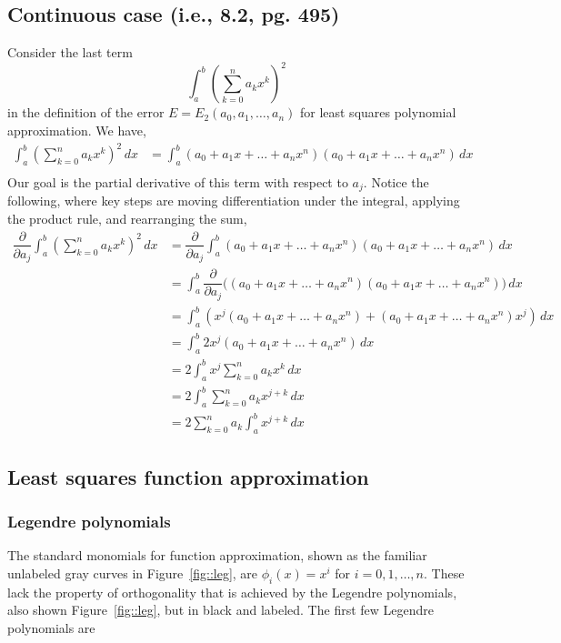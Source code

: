 \documentclass[11pt]{article}
\begin{document}
\subsection*{Continuous case (i.e., 8.2, pg. 495)}
Consider the last term \[\int_a^b \left(\sum_{k=0}^n a_k x^k\right)^2\] in the definition of the error \(E = E_2(a_0, a_1, \dots, a_n)\) for least squares polynomial approximation. We have,
\begin{align*}
\int_a^b \left(\sum_{k=0}^n a_k x^k\right)^2\,dx %
& = \int_a^b (a_0 + a_1x + \dots + a_n x^n)(a_0 + a_1x + \dots + a_n x^n)\,dx\\
\end{align*}
Our goal is the partial derivative of this term with respect to \(a_j\). Notice the following, where key steps are moving differentiation under the integral, applying the product rule, and rearranging the sum,
\begin{align*}
\dfrac{\partial}{\partial a_j}\int_a^b \left(\sum_{k=0}^n a_k x^k\right)^2\,dx & = \dfrac{\partial}{\partial a_j} \int_a^b (a_0 + a_1x + \dots + a_n x^n)(a_0 + a_1x + \dots + a_n x^n)\,dx\\
& = \int_a^b \dfrac{\partial}{\partial a_j} \Big((a_0 + a_1x + \dots + a_n x^n)(a_0 + a_1x + \dots + a_n x^n)\Big)\,dx\\
& = \int_a^b \left(x^j(a_0 + a_1x + \dots + a_n x^n) + (a_0 + a_1x + \dots + a_n x^n) x^j\right)\,dx\\
& = \int_a^b 2x^j(a_0 + a_1x + \dots + a_n x^n)\,dx\\
& = 2\int_a^b x^j\sum_{k=0}^n a_k x^k\,dx\\
& = 2\int_a^b \sum_{k=0}^n a_k x^{j+k}\,dx\\
& = 2\sum_{k=0}^n a_k \int_a^b x^{j+k}\,dx
\end{align*}




\subsection{Least squares function approximation}
\subsubsection{Legendre polynomials}
The standard monomials for function approximation, shown as the familiar unlabeled gray curves in Figure~\ref{fig::leg}, are \(\phi_i(x) = x^i\) for \(i=0, 1, \dots, n\). These lack the property of orthogonality that is achieved by the Legendre polynomials, also shown Figure~\ref{fig::leg}, but in black and labeled. The first few Legendre polynomials are
\end{document}
